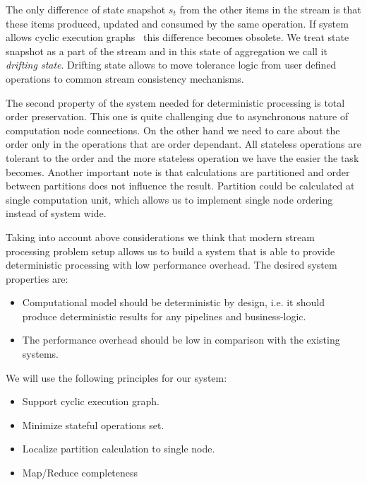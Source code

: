 The only difference of state snapshot $s_t$ from the other items in the stream is that these items produced, updated and consumed by the same operation. If system allows cyclic execution graphs~\cite{Murray:2013:NTD:2517349.2522738} this difference becomes obsolete. We treat state snapshot as a part of the stream and in this state of aggregation we call it {\it drifting state}. Drifting state allows to move tolerance logic from user defined operations to common stream consistency mechanisms.

The second property of the system needed for deterministic processing is total order preservation. This one is quite challenging due to asynchronous nature of computation node connections. On the other hand we need to care about the order only in the operations that are order dependant. All stateless operations are tolerant to the order and the more stateless operation we have the easier the task becomes. Another important note is that calculations are partitioned and order between partitions does not influence the result. Partition could be calculated at single computation unit, which allows us to implement single node ordering instead of system wide.

Taking into account above considerations we think that modern stream processing problem setup allows us to build a system that is able to provide deterministic processing with low performance overhead. The desired system properties are:
\begin{itemize}
    \item Computational model should be deterministic by design, i.e. it should produce deterministic results for any pipelines and business-logic.
    \item The performance overhead should be low in comparison with the existing systems.
\end{itemize}
We will use the following principles for our system:
\begin{itemize}
    \item Support cyclic execution graph.
    \item Minimize stateful operations set.
    \item Localize partition calculation to single node.
    \item Map/Reduce completeness
\end{itemize}
